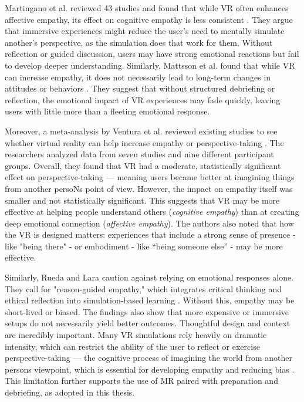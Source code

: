 Martingano et al. reviewed 43 studies and found that while VR often enhances affective empathy, its effect on cognitive empathy is less consistent \cite{Martingano2021}. They argue that immersive experiences might reduce the user's need to mentally simulate another's perspective, as the simulation does that work for them. Without reflection or guided discussion, users may have strong emotional reactions but fail to develop deeper understanding. Similarly, Mattsson et al. found that while VR can increase empathy, it does not necessarily lead to long-term changes in attitudes or behaviors \cite{Mattsson2024}. They suggest that without structured debriefing or reflection, the emotional impact of VR experiences may fade quickly, leaving users with little more than a fleeting emotional response.

\vspace{1em}

Moreover,  a meta-analysis by Ventura et al. reviewed existing studies to see whether virtual reality can help increase empathy or perspective-taking \cite{Ventura2020}. The researchers analyzed data from seven studies and nine different participant groups. Overall, they found that VR had a moderate, statistically significant effect on perspective-taking — meaning users became better at imagining things from another persoNs point of view. However, the impact on empathy itself was smaller and not statistically significant. This suggests that VR may be more effective at helping people understand others (\textit{cognitive empathy}) than at creating deep emotional connection (\textit{affective empathy}). The authors also noted that how the VR is designed matters: experiences that include a strong sense of presence - like "being there" - or embodiment - like “being someone else” - may be more effective. 

\vspace{1em}

Similarly, Rueda and Lara caution against relying on emotional responses alone. They call for "reason-guided empathy," which integrates critical thinking and ethical reflection into simulation-based learning \cite{Rueda2020}. Without this, empathy may be short-lived or biased. The findings also show that more expensive or immersive setups do not necessarily yield better outcomes. Thoughtful design and context are incredibly important. Many VR simulations rely heavily on dramatic intensity, which can restrict the ability of the user to reflect or exercise perspective-taking — the cognitive process of imagining the world from another persons viewpoint, which is essential for developing empathy and reducing bias \cite{Mattsson2024}. This limitation further supports the use of MR paired with preparation and debriefing, as adopted in this thesis.

